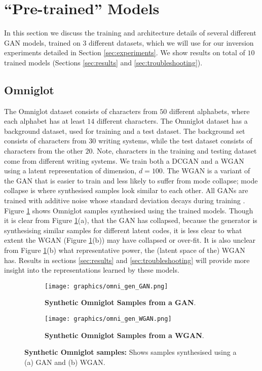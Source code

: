 \documentclass[journal]{IEEEtran}
\begin{document}
\section{``Pre-trained'' Models}
In this section we discuss the training and architecture details of several different GAN models, trained on $3$ different datasets, which we will use for our inversion experiments detailed in Section \ref{sec:experiments}. We show results on total of $10$ trained models (Sections \ref{sec:results} and \ref{sec:troubleshooting}).


    
  
  

  
\subsection{Omniglot}
The Omniglot dataset \cite{lake2015human} consists of characters from $50$ different alphabets, where each alphabet has at least $14$ different characters. The Omniglot dataset has a background dataset, used for training and a test dataset. The background set consists of characters from $30$ writing systems, while the test dataset consists of characters from the other $20$. Note, characters in the training and testing dataset come from different writing systems. We train both a DCGAN \cite{radford2015unsupervised} and a WGAN \cite{arjovsky2017wasserstein} using a latent representation of dimension, $d=100$. The WGAN \cite{arjovsky2017wasserstein} is a variant of the GAN that is easier to train and less likely to suffer from mode collapse; mode collapse is where synthesised samples look similar to each other. All GANs are trained with additive noise whose standard deviation decays during training \cite{arjovsky2017towards}.  Figure \ref{fig:omni_gen} shows Omniglot samples synthesised using the trained models. Though it is clear from Figure \ref{fig:omni_gen}(a), that the GAN has collapsed, because the generator is synthesising similar samples for different latent codes, it is less clear to what extent the WGAN  (Figure \ref{fig:omni_gen}(b)) may have collapsed or over-fit. It is also unclear from Figure \ref{fig:omni_gen}(b) what representative power, the (latent space of the)  WGAN has. Results in sections \ref{sec:results} and \ref{sec:troubleshooting} will provide more insight into the representations learned by these models.


\begin{figure}
\centering 
    \begin{subfigure}{\columnwidth}
    \texttt{[image: graphics/omni\_gen\_GAN.png]} %
    \caption{\textbf{Synthetic Omniglot Samples from a GAN}.}
    \end{subfigure}
    \begin{subfigure}{\columnwidth}
    \texttt{[image: graphics/omni\_gen\_WGAN.png]}
    \caption{\textbf{Synthetic Omniglot Samples from a WGAN}.} %
    \end{subfigure}
\centering
\caption{\textbf{Synthetic Omniglot samples:} Shows samples synthesised using a (a) GAN and (b) WGAN.}
\label{fig:omni_gen}
\end{figure}
\end{document}
